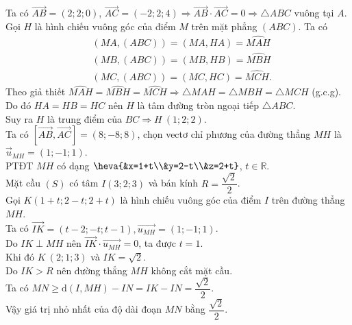 \begin{ex}
{\begin{center}
		\end{center}	
		Ta có $\overrightarrow{A B}=(2 ; 2 ; 0)$, $\overrightarrow{A C}=(-2 ; 2 ; 4) \Rightarrow \overrightarrow{A B} \cdot \overrightarrow{A C}=0 \Rightarrow \triangle ABC$ vuông tại $A$.\\
		Gọi $H$ là hình chiếu vuông góc của điểm $M$ trên mặt phẳng $(A B C)$. Ta có
		$$
		\begin{aligned}
			& (MA, (ABC))=(MA, HA)=\widehat{MAH} \\
			& (MB, (ABC))=(MB, HB)=\widehat{MBH} \\
			& (MC, (ABC))=(MC, HC)=\widehat{MCH}.
		\end{aligned}
		$$
		Theo giả thiết $\widehat{MAH}=\widehat{MBH}=\widehat{MCH} \Rightarrow \triangle MAH=\triangle MBH=\triangle MCH$ (g.c.g).\\
		Do đó $HA=HB=HC$ nên $H$ là tâm đường tròn ngoại tiếp $\triangle ABC$.\\
		Suy ra $H$ là trung điểm của $BC\Rightarrow H\ (1; 2; 2)$.\\
		Ta có $[\overrightarrow{AB}, \overrightarrow{AC}]=(8;-8; 8)$, chọn vectơ  chỉ phương của đường thẳng $MH$ là $\overrightarrow{u}_{MH}=(1;-1; 1)$. \\
		PTĐT $MH$ có dạng $\heva{&x=1+t\\&y=2-t\\&z=2+t}$, $t\in \mathbb{R}$.\\
		Mặt cầu $(S)$ có tâm $I(3 ; 2 ; 3)$ và bán kính $R=\dfrac{\sqrt{2}}{2}$.\\
		Gọi $K(1+t; 2-t; 2+t)$ là hình chiếu vuông góc của điểm $I$ trên đường thẳng $MH$.\\
		Ta có $\overrightarrow{IK}=(t-2;-t; t-1), \overrightarrow{u_{MH}}=(1;-1; 1)$.\\
		Do $IK\perp MH$ nên $\overrightarrow{IK} \cdot \overrightarrow{u_{MH}}=0$, ta được $t=1$.\\
		Khi đó $K\ (2; 1; 3)$ và $IK=\sqrt{2}$.\\
		Do $IK > R$ nên đường thẳng $MH$ không cắt mặt cầu.\\
		Ta có $MN\geq \mathrm{d}(I, MH)-IN=IK-IN=\dfrac{\sqrt{2}}{2}$.\\
		Vậy giá trị nhỏ nhất của độ dài đoạn $M N$ bằng $\dfrac{\sqrt{2}}{2}$.
	}
\end{ex}
